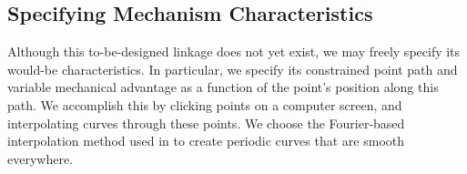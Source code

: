 \documentclass[journal]{IEEEtran}
\begin{document}
\subsection{Specifying Mechanism Characteristics}
\label{sec:spec_mech_char}

Although this to-be-designed linkage does not yet exist, we may freely specify its would-be characteristics.  
In particular, we specify its constrained point path and variable mechanical advantage as a function of the point's position along this path.
We accomplish this by clicking points on a computer screen, and interpolating curves through these points.
We choose the Fourier-based interpolation method used in \cite{plecnikControllingMovementTRR2016} to create periodic curves that are smooth everywhere.

\begin{figure}[!t]
\centering
{}
\hfil
{}
\hfil

\end{figure}
\end{document}
